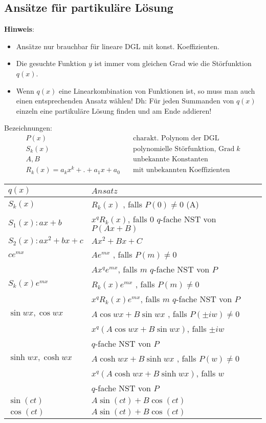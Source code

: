 \subsection{Ansätze für partikuläre Lösung}
\label{sec:ansatz-dgl}
	\textbf{Hinweis}:
	\begin{itemize}
		\item Ansätze nur brauchbar für lineare DGL mit konst. Koeffizienten.

		\item Die gesuchte Funktion $y$ ist immer vom gleichen Grad wie die Störfunktion $q(x)$.

		\item Wenn $q(x)$ eine Linearkombination von Funktionen ist, so muss man auch einen entsprechenden Ansatz wählen! Dh: Für jeden Summanden von $q(x)$ einzeln eine partikuläre Lösung finden und am Ende addieren!
	\end{itemize}
	Bezeichnungen:
	\begin{align*}
	P(x)  &  \quad \text{charakt. Polynom der DGL}  \\
	S_k(x) & \quad \text{polynomielle Störfunktion, Grad} \; k \\
	A, B & \quad \text{unbekannte Konstanten} \\
	R_k(x) = a_k x^k + . + a_1 x + a_0 & \quad \text{mit unbekannten Koeffizienten}
	\end{align*}
		
	\begin{tabular}{l|l}
		$q(x)$ & $Ansatz$ \\ \hline \hline
		
		$ S_k(x) $ & $R_k(x)$ , falls $P(0) \neq 0$ (A)\\
		\small{$S_1(x): ax + b$} &  $x^q R_k(x)$, falls $0$ $q$-fache NST von $P (Ax + B)$ \\ 
		\small{$S_2(x): ax^2 + bx + c$} & $Ax^2 + Bx + C$\\ \hline

		$ c e^{mx} $  & $A e^{mx}$ , falls $P(m) \neq 0$\\ 
		&  $A x^q e^{mx}$, falls $m$ $q$-fache NST von $P$ \\ \hline

		$ S_k(x) e^{mx} $  & $R_k(x) e^{mx}$ , falls $P(m) \neq 0$\\
		&  $x^q R_k(x) e^{mx}$, falls $m$ $q$-fache NST von $P$ \\ \hline
		$ \sin wx, \cos wx $  & $A \cos wx + B \sin wx$ , falls $P(\pm iw) \neq 0$\\
		&  $x^q (A \cos wx + B \sin wx)$, falls $\pm iw$ \\
		& $q$-fache NST von $P$ \\ \hline
		$ \sinh wx, \cosh wx $  & $A \cosh wx + B \sinh wx$ , falls $P(w) \neq 0$\\
		&  $x^q (A \cosh wx + B \sinh wx)$, falls $w$ \\
		& $q$-fache NST von $P$ \\
		$\sin(ct)$ & $A\sin(ct) + B\cos(ct)$\\
		$\cos(ct)$ & $A\sin(ct) + B\cos(ct)$
	\end{tabular}

